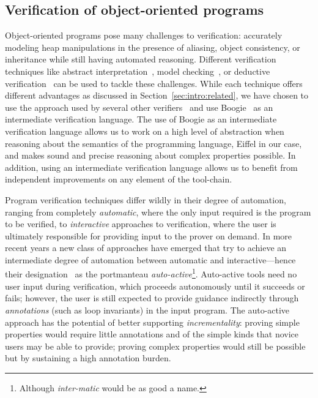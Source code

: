 \subsection{Verification of object-oriented programs}

Object-oriented programs pose many challenges to verification: accurately modeling heap manipulations in the presence of aliasing, object consistency, or inheritance while still having automated reasoning.
Different verification techniques like abstract interpretation~\cite{COUSOT77,COUSOT79}, model checking~\cite{CLARKE81}, or deductive verification~\cite{HOARE69} can be used to tackle these challenges.
While each technique offers different advantages as discussed in Section~\ref{sec:intro:related}, we have chosen to use the approach used by several other verifiers~\cite{BARNETT05,COHEN09,LEINO10,LEINO10c,COK11} and use Boogie~\cite{LEINO08} as an intermediate verification language.
The use of Boogie as an intermediate verification language allows us to work on a high level of abstraction when reasoning about the semantics of the programming language, Eiffel in our case, and makes sound and precise reasoning about complex properties possible.
In addition, using an intermediate verification language allows us to benefit from independent improvements on any element of the tool-chain.

Program verification techniques differ wildly in their degree of automation, ranging from completely \emph{automatic}, where the only input required is the program to be verified, to \emph{interactive} approaches to verification, where the user is ultimately responsible for providing input to the prover on demand.
In more recent years a new class of approaches have emerged that try to achieve an intermediate degree of automation between automatic and interactive---hence their designation~\cite{LEINO10b} as the portmanteau \emph{auto-active}\footnote{Although \emph{inter-matic} would be as good a name.}.
Auto-active tools need no user input during verification, which proceeds autonomously until it succeeds or fails; however, the user is still expected to provide guidance indirectly through \emph{annotations} (such as loop invariants) in the input program.
The auto-active approach has the potential of better supporting \emph{incrementality}: proving simple properties would require little annotations and of the simple kinds that novice users may be able to provide; proving complex properties would still be possible but by sustaining a high annotation burden.

